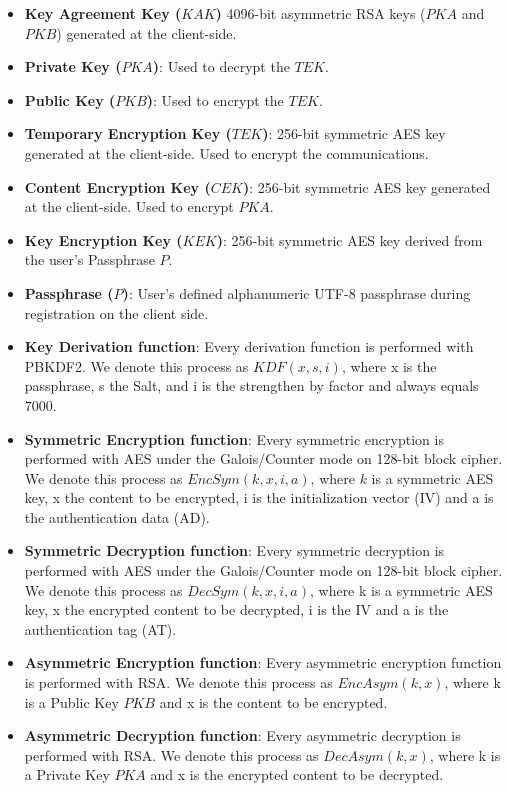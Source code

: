 \documentclass[a4paper,10pt]{article}
\begin{document}
\begin{itemize}
    \item \textbf{Key Agreement Key ($KAK$)}
    4096-bit asymmetric RSA keys ($PKA$ and $PKB$) generated at the client-side.
    \item \textbf{Private Key ($PKA$)}:
    Used to decrypt the $TEK$.
    \item \textbf{Public Key ($PKB$)}:
    Used to encrypt the $TEK$.
    \item \textbf{Temporary Encryption Key ($TEK$)}:
    256-bit symmetric AES key generated at the client-side. Used to encrypt the communications.
    \item \textbf{Content Encryption Key ($CEK$)}:
    256-bit symmetric AES key generated at the client-side. Used to encrypt $PKA$.
    \item \textbf{Key Encryption Key ($KEK$)}:
    256-bit symmetric AES key derived from the user's Passphrase $P$.
    \item \textbf{Passphrase ($P$)}:
    User's defined alphanumeric UTF-8 passphrase during registration on the client side.
    \item \textbf{Key Derivation function}:
    Every derivation function is performed with PBKDF2. We denote this process as $KDF(x, s, i)$, where x is the passphrase, s the Salt, and i is the strengthen by factor and always equals 7000.
    \item \textbf{Symmetric Encryption function}:
    Every symmetric encryption is performed with AES under the Galois/Counter mode on 128-bit block cipher. We denote this process as $EncSym(k, x, i, a)$, where $k$ is a symmetric AES key, x the content to be encrypted, i is the initialization vector (IV) and a is the authentication data (AD).
    \item \textbf{Symmetric Decryption function}:
    Every symmetric decryption is performed with AES under the Galois/Counter mode on 128-bit block cipher. We denote this process as $DecSym(k,x,i,a)$, where k is a symmetric AES key, x the encrypted content to be decrypted, i is the IV and a is the authentication tag (AT).
    \item \textbf{Asymmetric Encryption function}:
    Every asymmetric encryption function is performed with RSA. We denote this process as $EncAsym(k,x)$, where k is a Public Key $PKB$ and x is the content to be encrypted.
    \item \textbf{Asymmetric Decryption function}:
    Every asymmetric decryption is performed with RSA. We denote this process as $DecAsym(k,x)$, where k is a Private Key $PKA$ and x is the encrypted content to be decrypted.
    
\end{itemize}
\end{document}
